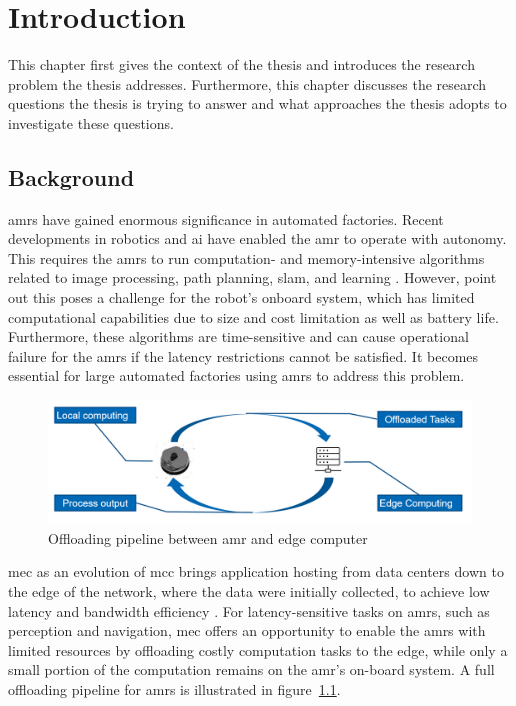 \chapter{Introduction}\label{ch:introduction}

This chapter first gives the context of the thesis and introduces the research problem the thesis addresses. Furthermore, this chapter discusses the research questions the thesis is trying to answer and what approaches the thesis adopts to investigate these questions.

\section{Background}\label{sec:introduction:background}

\glspl{amr} have gained enormous significance in automated factories. Recent developments in robotics and \gls{ai} have enabled the \gls{amr} to operate with autonomy. This requires the \glspl{amr} to run computation- and memory-intensive algorithms related to image processing, path planning, \gls{slam}, and learning \cite{Saeik2021}. However, \citeauthor*{Baxi2022} point out this poses a challenge for the robot's onboard system, which has limited computational capabilities due to size and cost limitation as well as battery life. Furthermore, these algorithms are time-sensitive and can cause operational failure for the \glspl{amr} if the latency restrictions cannot be satisfied. It becomes essential for large automated factories using \glspl{amr} to address this problem. 


\begin{figure}[htb]
    \centering

    \includegraphics[width=120mm]{figures/setup/amr_offloading.png}
    \caption{Offloading pipeline between \gls{amr} and edge computer}

    \label{fig:amr_offloading}
\end{figure}

\gls{mec} as an evolution of \gls*{mcc} brings application hosting from data centers down to the edge of the network, where the data were initially collected, to achieve low latency and bandwidth efficiency \cite{Lin2019}. For latency-sensitive tasks on \glspl{amr}, such as perception and navigation, \gls{mec} offers an opportunity to enable the \glspl{amr} with limited resources by offloading costly computation tasks to the edge, while only a small portion of the computation remains on the \gls{amr}'s on-board system. A full offloading pipeline for \glspl{amr} is illustrated in figure~\cref{fig:amr_offloading}.


